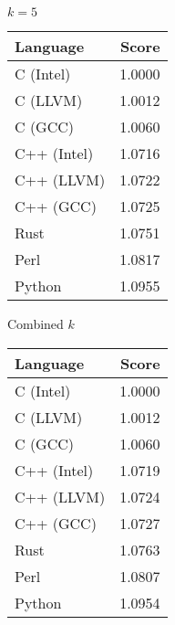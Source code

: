 \begin{subtable}{0.33\textwidth}
    \centering
    \caption{$k=5$}
    \label{table:energy:regexp(5)}
    \begin{tabular}{|l|r|}
        \hline
        Language & Score \\
        \hline
        C (Intel) & 1.0000 \\
        C (LLVM) & 1.0012 \\
        C (GCC) & 1.0060 \\
        C++ (Intel) & 1.0716 \\
        C++ (LLVM) & 1.0722 \\
        C++ (GCC) & 1.0725 \\
        Rust & 1.0751 \\
        Perl & 1.0817 \\
        Python & 1.0955 \\
        \hline
    \end{tabular}
\end{subtable}%
\begin{subtable}{0.33\textwidth}
    \centering
    \caption{Combined $k$}
    \label{table:energy:regexp:combined}
    \begin{tabular}{|l|r|}
        \hline
        Language & Score \\
        \hline
        C (Intel) & 1.0000 \\
        C (LLVM) & 1.0012 \\
        C (GCC) & 1.0060 \\
        C++ (Intel) & 1.0719 \\
        C++ (LLVM) & 1.0724 \\
        C++ (GCC) & 1.0727 \\
        Rust & 1.0763 \\
        Perl & 1.0807 \\
        Python & 1.0954 \\
        \hline
    \end{tabular}
\end{subtable}